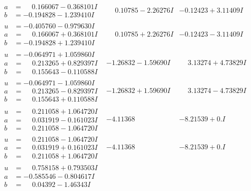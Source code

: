 \documentclass[1p]{elsarticle_modified}
\theoremstyle{definition}
\begin{document}
$$\begin{array}{c|c|c}
\begin{aligned}
a &= \phantom{-}0.166067 - 0.368101 I \\
b &= -0.194828 - 1.239410 I\end{aligned}
 & \phantom{-}0.10785 - 2.26276 I & -0.12423 + 3.11409 I \\ \hline\begin{aligned}
u &= -0.405760 - 0.979630 I \\
a &= \phantom{-}0.166067 + 0.368101 I \\
b &= -0.194828 + 1.239410 I\end{aligned}
 & \phantom{-}0.10785 + 2.26276 I & -0.12423 - 3.11409 I \\ \hline\begin{aligned}
u &= -0.064971 + 1.059860 I \\
a &= \phantom{-}0.213265 + 0.829397 I \\
b &= \phantom{-}0.155643 - 0.110588 I\end{aligned}
 & -1.26832 - 1.59690 I & \phantom{-}3.13274 + 4.73829 I \\ \hline\begin{aligned}
u &= -0.064971 - 1.059860 I \\
a &= \phantom{-}0.213265 - 0.829397 I \\
b &= \phantom{-}0.155643 + 0.110588 I\end{aligned}
 & -1.26832 + 1.59690 I & \phantom{-}3.13274 - 4.73829 I \\ \hline\begin{aligned}
u &= \phantom{-}0.211058 + 1.064720 I \\
a &= \phantom{-}0.031919 - 0.161023 I \\
b &= \phantom{-}0.211058 - 1.064720 I\end{aligned}
 & -4.11368\phantom{ +0.000000I} & -8.21539 + 0. I\phantom{ +0.000000I} \\ \hline\begin{aligned}
u &= \phantom{-}0.211058 - 1.064720 I \\
a &= \phantom{-}0.031919 + 0.161023 I \\
b &= \phantom{-}0.211058 + 1.064720 I\end{aligned}
 & -4.11368\phantom{ +0.000000I} & -8.21539 + 0. I\phantom{ +0.000000I} \\ \hline\begin{aligned}
u &= \phantom{-}0.758158 + 0.793503 I \\
a &= -0.585546 - 0.804617 I \\
b &= \phantom{-}0.04392 - 1.46343 I\end{aligned}

\end{array}$$
\end{document}
